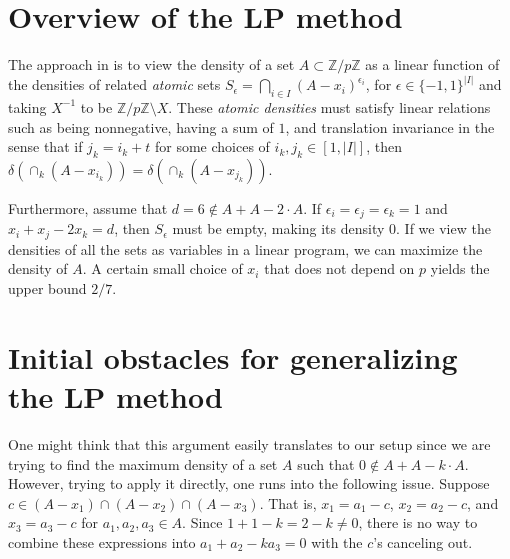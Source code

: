 \documentclass[a4paper,12pt,reqno]{amsart}
\newcommand{\abs}[1]{\left|#1\right|}
\newcommand{\1}{\mathbf{1}}
\newcommand{\0}{\mathbf{0}}
\theoremstyle{definition}
\newcommand{\mb}{\mathbb}
\providecommand{\abs}[1]{\lvert#1\rvert}
\begin{document}
\bigskip


\section{Overview of the LP method}

The approach in \cite{LMPV} is to view the density of a set $A \subset \mb{Z}/p\mb{Z}$
as a linear function of the densities of related \emph{atomic} sets $S_{\epsilon} = \bigcap_{i \in I}(A - x_i)^{\epsilon_i}$, for $\epsilon \in \{-1, 1\}^{\abs{I}}$ and taking $X^{-1}$ to be $\mb{Z}/p\mb{Z} \setminus X$. These \emph{atomic densities} must satisfy linear relations such as being nonnegative, having a sum of $1$, and translation invariance in the sense that if $j_k = i_k + t$ for some choices of $i_k, j_k \in [1, \abs{I}]$, then $\delta\left(\cap_k(A - x_{i_k})\right) = \delta\left(\cap_k(A - x_{j_k})\right)$.

Furthermore, assume that $d = 6 \notin A + A - 2 \cdot A$. If $\epsilon_i = \epsilon_j = \epsilon_k = 1$ and $x_i + x_j - 2x_k = d$, then $S_\epsilon$ must be empty, making its density 0. If we view the densities of all the sets as variables in a linear program, we can maximize the density of $A$. A certain small choice of $x_i$ that does not depend on $p$ yields the upper bound $2/7$.

\section{Initial obstacles for generalizing the LP method}\label{sec:initial-obstacles}

One might think that this argument easily translates to our setup since we are trying to find the maximum density of a set $A$ such that $0 \notin A + A - k \cdot A$. However, trying to apply it directly, one runs into the following issue. Suppose $c \in (A - x_1) \cap (A - x_2) \cap (A - x_3)$. That is, $x_1 = a_1 - c$, $x_2 = a_2 - c$, and $x_3 = a_3 - c$ for $a_1, a_2, a_3 \in A$. Since $1 + 1 - k = 2 - k \neq 0$, there is no way to combine these expressions into $a_1 + a_2 - ka_3 = 0$ with the $c$'s canceling out.
\end{document}
